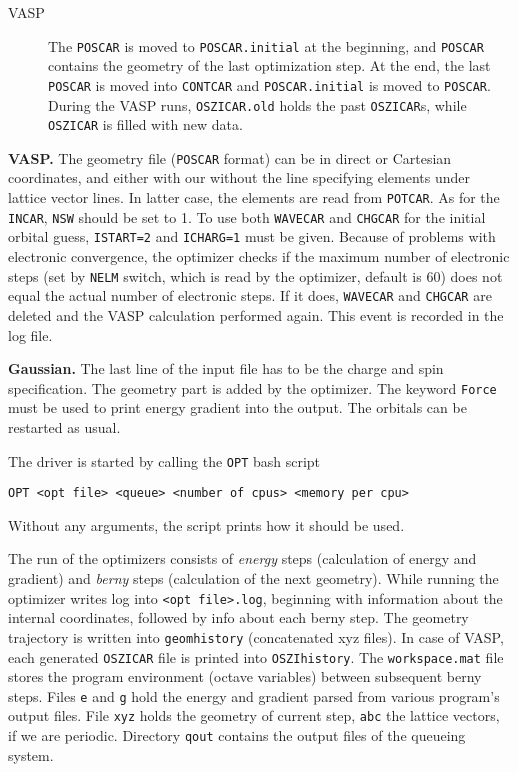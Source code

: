 \documentclass[12pt,a4]{article}
\newcommand{\ttt}{\texttt}
\begin{document}
\begin{description}
\item[VASP] The \ttt{POSCAR} is moved to \ttt{POSCAR.initial} at the beginning, and \ttt{POSCAR} contains the geometry of the last optimization step. At the end, the last \ttt{POSCAR} is moved into \ttt{CONTCAR} and \ttt{POSCAR.initial} is moved to \ttt{POSCAR}. During the VASP runs, \ttt{OSZICAR.old} holds the past \ttt{OSZICAR}s, while \ttt{OSZICAR} is filled with new data.
\end{description}

\textbf{VASP.} The geometry file (\ttt{POSCAR} format) can be in direct or Cartesian coordinates, and either with our without the line specifying elements under lattice vector lines. In latter case, the elements are read from \ttt{POTCAR}. As for the \ttt{INCAR}, \ttt{NSW} should be set to 1. To use both \ttt{WAVECAR} and \ttt{CHGCAR} for the initial orbital guess, \ttt{ISTART=2} and \ttt{ICHARG=1} must be given. Because of problems with electronic convergence, the optimizer checks if the maximum number of electronic steps (set by \ttt{NELM} switch, which is read by the optimizer, default is 60) does not equal the actual number of electronic steps. If it does, \ttt{WAVECAR} and \ttt{CHGCAR} are deleted and the VASP calculation performed again. This event is recorded in the log file.

\textbf{Gaussian.} The last line of the input file has to be the charge and spin specification. The geometry part is added by the optimizer. The keyword \ttt{Force} must be used to print energy gradient into the output. The orbitals can be restarted as usual.

The driver is started by calling the \ttt{OPT} bash script
\begin{verbatim}
OPT <opt file> <queue> <number of cpus> <memory per cpu>
\end{verbatim}
Without any arguments, the script prints how it should be used.

The run of the optimizers consists of \emph{energy} steps (calculation of energy and gradient) and \emph{berny} steps (calculation of the next geometry). While running the optimizer writes log into \ttt{<opt file>.log}, beginning with information about the internal coordinates, followed by info about each berny step. The geometry trajectory is written into \ttt{geomhistory} (concatenated xyz files). In case of VASP, each generated \ttt{OSZICAR} file is printed into \ttt{OSZIhistory}. The \ttt{workspace.mat} file stores the program environment (octave variables) between subsequent berny steps. Files \ttt{e} and \ttt{g} hold the energy and gradient parsed from various program's output files. File \ttt{xyz} holds the geometry of current step, \ttt{abc} the lattice vectors, if we are periodic. Directory \ttt{qout} contains the output files of the queueing system.
\end{document}
